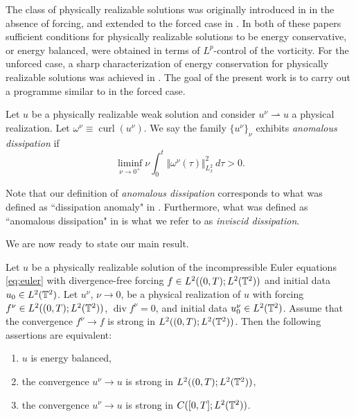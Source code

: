 \documentclass[reqno,12pt]{amsart}
\DeclareMathOperator{\dv}{div}
\DeclareMathOperator{\curl}{curl}
\begin{document}
The class of physically realizable solutions was originally introduced in \cite{CLNS2016} in the absence of forcing, and extended to the forced case in \cite{LN2022}. In both of these papers sufficient conditions for physically realizable solutions to be energy conservative, or energy balanced, were obtained in terms of $L^p$-control of the vorticity. For the unforced case, a sharp characterization of energy conservation for physically realizable solutions was achieved in \cite{LMPP2021a}. The goal of the present work is to carry out a programme similar to \cite{LMPP2021a} in the forced case.


\begin{definition} \label{def:anomdissinvdiss}
Let $u$ be a physically realizable weak solution and consider $u^\nu \rightharpoonup u$ a physical realization. Let $\omega^\nu \equiv \curl (u^\nu)$. We say the family $\{u^\nu\}_\nu$ exhibits {\em anomalous dissipation} if
\[\liminf_{\nu \to 0^+} \nu \int_0^t \Vert \omega^\nu(\tau) \Vert_{L^2_x}^2 \, d\tau > 0.\]
\end{definition}

\begin{remark} \label{rem:anomdissinvdiss}
Note that our definition of {\em anomalous dissipation} corresponds to what was defined as ``dissipation anomaly" in \cite{Cheskidov23}. Furthermore, what was defined as ``anomalous dissipation" in \cite{Cheskidov23} is what we refer to as {\em inviscid dissipation}.
\end{remark}




We are now ready to state our main result.

\begin{theorem}
  \label{thm:ebal}
Let $u$ be a physically realizable solution of the incompressible Euler equations \eqref{eq:euler} with divergence-free forcing $f\in L^2 ((0,T);L^2 (\mathbb{T}^2))$ and initial data $u_0\in L^2(\mathbb{T}^2)$. Let $u^\nu$, $\nu \to 0$, be a physical realization of $u$ with forcing $f^\nu \in L^2 ((0,T);L^2 (\mathbb{T}^2))$, $\dv f^\nu = 0$, and initial data $u^\nu_0 \in L^2 (\mathbb{T}^2)$. Assume that the convergence $f^\nu \to f$ is strong in
$L^2 ((0,T);L^2 (\mathbb{T}^2))$. Then the following assertions are equivalent:
\begin{enumerate}
\item $u$ is energy balanced, \label{item1}
\item the convergence $u^\nu \to u$ is strong in $L^2 ((0,T);L^2 (\mathbb{T}^2))$, \label{item2}
\item the convergence $u^\nu \to u$ is strong in $C([0,T];L^2 (\mathbb{T}^2))$. \label{item3}
\end{enumerate}
\end{theorem}
\end{document}
